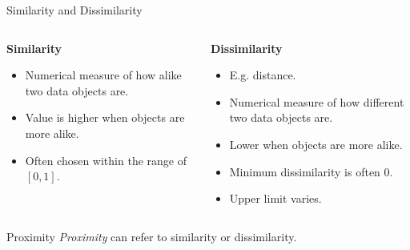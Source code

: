 \begin{frame}{Similarity and Dissimilarity}
	\begin{columns}
		\begin{column}{0.5\textwidth}
			\textbf{Similarity}
			\begin{itemize}
				\item Numerical measure of how alike two data objects are.
				\item Value is higher when objects are more alike.
				\item Often chosen within the range of $[0,1]$.
			\end{itemize}
		\end{column}
		\begin{column}{0.5\textwidth}
			\textbf{Dissimilarity}
			\begin{itemize}
				\item E.g. distance.
				\item Numerical measure of how different two data objects are.
				\item Lower when objects are more alike.
				\item Minimum dissimilarity is often $0$.
				\item Upper limit varies.
			\end{itemize}
		\end{column}
	\end{columns}

	\begin{alertblock}{Proximity}
		\textit{Proximity} can refer to similarity or dissimilarity.
	\end{alertblock}
\end{frame}

